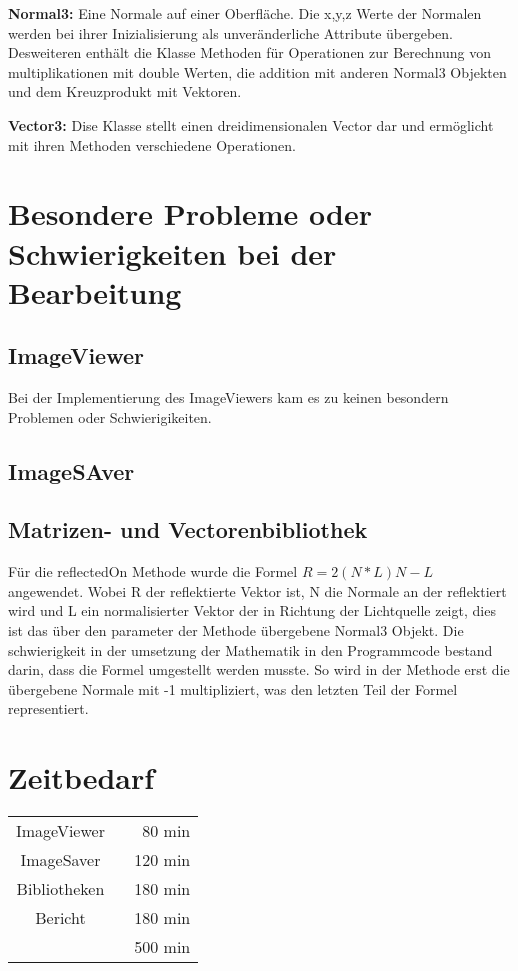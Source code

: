 \documentclass[a4paper,10pt]{ltxdoc}
\begin{document}
\textbf{Normal3:} Eine Normale auf einer Oberfläche. Die x,y,z Werte der Normalen werden bei ihrer Inizialisierung als unveränderliche Attribute übergeben. Desweiteren enthält die Klasse Methoden für Operationen zur Berechnung von multiplikationen mit double Werten, die addition mit anderen Normal3 Objekten und dem Kreuzprodukt mit Vektoren.

\textbf{Vector3:} Dise Klasse stellt einen dreidimensionalen Vector dar und ermöglicht mit ihren Methoden verschiedene Operationen.


\section{Besondere Probleme oder Schwierigkeiten bei der Bearbeitung}
\subsection{ImageViewer}
Bei der Implementierung des ImageViewers kam es zu keinen besondern Problemen oder Schwierigikeiten.
\subsection{ImageSAver}
\subsection{Matrizen- und Vectorenbibliothek}
Für die reflectedOn Methode wurde die Formel 
\begin{math} R=2(N*L)N-L \end{math}
angewendet.  Wobei R der reflektierte Vektor ist, N die Normale an der reflektiert wird und L ein normalisierter Vektor der in Richtung der Lichtquelle zeigt, dies ist das über den parameter der Methode übergebene Normal3 Objekt. Die schwierigkeit in der umsetzung der Mathematik in den Programmcode bestand darin, dass die Formel umgestellt werden musste. So wird in der Methode erst die übergebene Normale mit -1 multipliziert, was den letzten Teil der Formel representiert. 

\section{Zeitbedarf}
\begin{center}
\begin{tabular}{cr}
ImageViewer	  \	&80 min	\\
ImageSaver 	\	&120 min	\\
Bibliotheken \	&180 min	\\
Bericht  \		&180 min	 \\
	\hline
	&500 min
\end{tabular}
\end{center}
\end{document}
